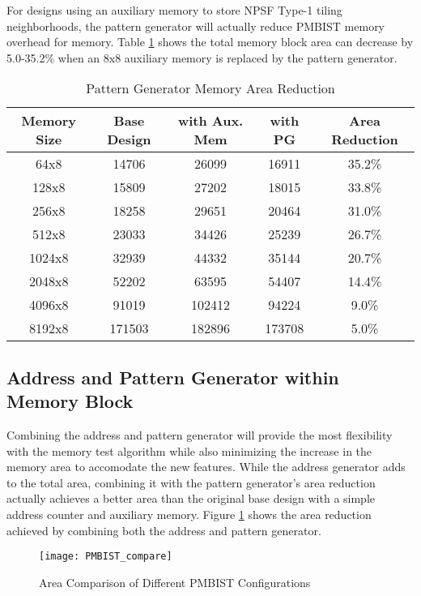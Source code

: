 For designs using an auxiliary memory to store NPSF Type-1 tiling neighborhoods, the pattern generator will actually reduce PMBIST memory overhead for memory.  Table \ref{tab:pg_memory_overhead} shows the total memory block area can decrease by 5.0-35.2\% when an 8x8 auxiliary memory is replaced by the pattern generator.  

\begin{table}[h]
\caption{Pattern Generator Memory Area Reduction}
\centering
\begin{tabular}{|c| c| c| c| c|}
\hline
Memory Size & Base Design & with Aux. Mem & with PG & Area Reduction \\
\hline\hline
64x8   & 14706  & 26099  & 16911  & 35.2\% \\
128x8  & 15809  & 27202  & 18015  & 33.8\% \\
256x8  & 18258  & 29651  & 20464  & 31.0\% \\
512x8  & 23033  & 34426  & 25239  & 26.7\% \\
1024x8 & 32939  & 44332  & 35144  & 20.7\% \\
2048x8 & 52202  & 63595  & 54407  & 14.4\% \\
4096x8 & 91019  & 102412 & 94224  &  9.0\% \\
8192x8 & 171503 & 182896 & 173708 &  5.0\% \\ [0.5ex]
\hline
\end{tabular}
\label{tab:pg_memory_overhead}
\end{table}

\subsection{Address and Pattern Generator within Memory Block}
Combining the address and pattern generator will provide the most flexibility with the memory test algorithm while also minimizing the increase in the memory area to accomodate the new features.  While the address generator adds to the total area, combining it with the pattern generator's area reduction actually achieves a better area than the original base design with a simple address counter and auxiliary memory.  Figure \ref{fig:all_compare} shows the area reduction achieved by combining both the address and pattern generator.

\begin{figure}[h]
  \centering
  \texttt{[image: PMBIST\_compare]}
  \caption{Area Comparison of Different PMBIST Configurations}
  \label{fig:all_compare}
\end{figure}

